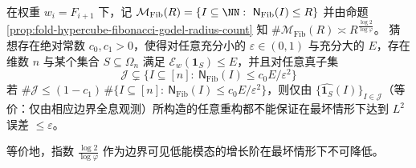 \begin{conjecture}[斐波那契谱指数的最坏情形刚性]\label{conj:fold-hypercube-fibonacci-spectral-exponent-rigidity}
在权重 \(w_i=F_{i+1}\) 下，记
\(
\mathcal M_{\mathrm{Fib}}(R)=\{I\subseteq\NN:\ \mathsf N_{\mathrm{Fib}}(I)\le R\}
\)
并由命题 \ref{prop:fold-hypercube-fibonacci-godel-radius-count} 知 \(\#\mathcal M_{\mathrm{Fib}}(R)\asymp R^{\frac{\log 2}{\log\varphi}}\)。
猜想存在绝对常数 \(c_0,c_1>0\)，使得对任意充分小的 \(\varepsilon\in(0,1)\) 与充分大的 \(E\)，存在维数 \(n\) 与某个集合 \(S\subseteq\Omega_n\) 满足 \(\mathcal E_w(\mathbf 1_S)\le E\)，并且对任意真子集
\[
\mathcal J\subsetneq \{I\subseteq[n]:\ \mathsf N_{\mathrm{Fib}}(I)\le c_0E/\varepsilon^2\}
\]
若 \(\#\mathcal J\le (1-c_1)\,\#\{I\subseteq[n]:\ \mathsf N_{\mathrm{Fib}}(I)\le c_0E/\varepsilon^2\}\)，则仅由 \(\{\widehat{\mathbf 1_S}(I)\}_{I\in\mathcal J}\)（等价：仅由相应边界全息观测）所构造的任意重构都不能保证在最坏情形下达到 \(L^2\) 误差 \(\le \varepsilon\)。
\par
等价地，指数 \(\frac{\log 2}{\log\varphi}\) 作为边界可见低能模态的增长阶在最坏情形下不可降低。
\end{conjecture}

\endinput
